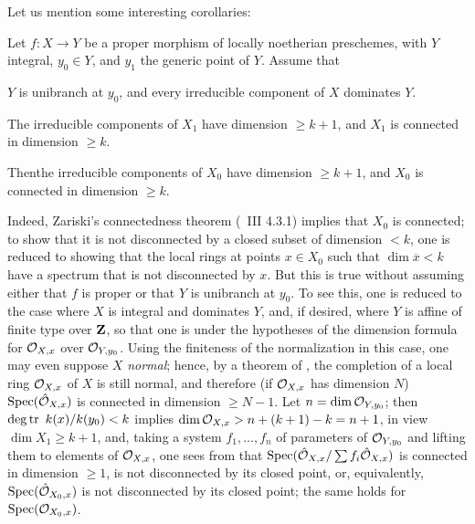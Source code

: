 Let us mention some interesting corollaries:

\begin{corollaire} \label{XIII.2.2}
Let $f\colon X\to Y$ be a proper morphism of locally noetherian preschemes, with $Y$ integral, $y_0\in Y$, and $y_1$ the generic point of $Y$. Assume that
\begin{enumeratea}
\item
$Y$ is unibranch at $y_0$, and every irreducible component of $X$ dominates $Y$.
\item
The irreducible components of $X_1$ have dimension $\ge k+1$, and $X_1$ is connected in dimension $\ge k$.
\end{enumeratea}

Then\pageoriginale the irreducible components of $X_0$ have dimension $\ge k+1$, and $X_0$ is connected in dimension $\ge k$.
\end{corollaire}

Indeed, Zariski's connectedness theorem (\cf\ \EGA III 4.3.1) implies that $X_0$ is connected; to show that it is not disconnected by a closed subset of dimension $<k$, one is reduced to showing that the local rings at points $x\in X_0$ such that $\dim \overline{x}<k$ have a spectrum that is not disconnected by $x$. But this is true without assuming either that $f$ is proper or that $Y$ is unibranch at $y_0$. To see this, one is reduced to the case where $X$ is integral and dominates $Y$, and, if desired, where $Y$ is affine of finite type over $\ZZ$, so that one is under the hypotheses of the dimension formula for $\Oo_{X, x}$ over $\Oo_{Y, y_0}$. Using the finiteness of the normalization in this case, one may even suppose $X$ \emph{normal}; hence, by a theorem of , the completion of a local ring $\Oo_{X, x}$ of $X$ is still normal, and therefore (if $\Oo_{X, x}$ has dimension $N$) $\Spec (\hat{\Oo}_{X, x})$ is connected in dimension $\ge N-1$. Let $n=\dim\Oo_{\sisi{X}{Y}, y_0}$; then $\degtr~k(x)/k(y_0)<k$ implies $\dim \Oo_{X, x}>n+(k+1)-k=n+1$, in view $\dim X_1\ge k+1$, and, taking a system $f_1, \dotsc, f_n$ of parameters of $\Oo_{Y, y_0}$ and lifting them to elements of $\Oo_{X, x}$, one sees from  that $\Spec (\hat{\Oo}_{X, x}/\sum f_i\hat{\Oo}_{X, x})$ is connected in dimension $\ge 1$, \ie is not disconnected by its closed point, or, equivalently, $\Spec(\hat{\Oo}_{X_0, x})$ is not disconnected by its closed point; \afortiori the same holds for $\Spec (\Oo_{X_0, x})$.

